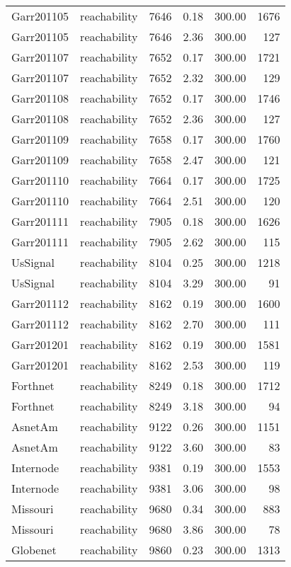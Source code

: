 \begin{tabular}{llrrrr}
Garr201105 & reachability & 7646 & 0.18 & 300.00 & 1676 \\
Garr201105 & reachability & 7646 & 2.36 & 300.00 & 127 \\
Garr201107 & reachability & 7652 & 0.17 & 300.00 & 1721 \\
Garr201107 & reachability & 7652 & 2.32 & 300.00 & 129 \\
Garr201108 & reachability & 7652 & 0.17 & 300.00 & 1746 \\
Garr201108 & reachability & 7652 & 2.36 & 300.00 & 127 \\
Garr201109 & reachability & 7658 & 0.17 & 300.00 & 1760 \\
Garr201109 & reachability & 7658 & 2.47 & 300.00 & 121 \\
Garr201110 & reachability & 7664 & 0.17 & 300.00 & 1725 \\
Garr201110 & reachability & 7664 & 2.51 & 300.00 & 120 \\
Garr201111 & reachability & 7905 & 0.18 & 300.00 & 1626 \\
Garr201111 & reachability & 7905 & 2.62 & 300.00 & 115 \\
UsSignal & reachability & 8104 & 0.25 & 300.00 & 1218 \\
UsSignal & reachability & 8104 & 3.29 & 300.00 & 91 \\
Garr201112 & reachability & 8162 & 0.19 & 300.00 & 1600 \\
Garr201112 & reachability & 8162 & 2.70 & 300.00 & 111 \\
Garr201201 & reachability & 8162 & 0.19 & 300.00 & 1581 \\
Garr201201 & reachability & 8162 & 2.53 & 300.00 & 119 \\
Forthnet & reachability & 8249 & 0.18 & 300.00 & 1712 \\
Forthnet & reachability & 8249 & 3.18 & 300.00 & 94 \\
AsnetAm & reachability & 9122 & 0.26 & 300.00 & 1151 \\
AsnetAm & reachability & 9122 & 3.60 & 300.00 & 83 \\
Internode & reachability & 9381 & 0.19 & 300.00 & 1553 \\
Internode & reachability & 9381 & 3.06 & 300.00 & 98 \\
Missouri & reachability & 9680 & 0.34 & 300.00 & 883 \\
Missouri & reachability & 9680 & 3.86 & 300.00 & 78 \\
Globenet & reachability & 9860 & 0.23 & 300.00 & 1313 \\

\end{tabular}
